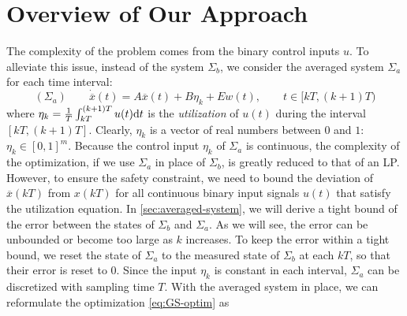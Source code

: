 \section{Overview of Our Approach}


The complexity of the problem comes from the binary control inputs $u$. To
alleviate this issue, instead of the system $\Sigma_b$, we consider the
averaged system $\Sigma_a$ for each time interval:
\[ (\Sigma_a) \hspace{2em} \dot{\overbar{x}} (t) = A \overbar{x} (t) + B
   \eta_k + Ew (t), \hspace{2em} t \in [kT, (k + 1) T) \]
where $\eta_k = \frac{1}{T} \int_{kT}^{(k + 1) T} u (t) \mathrm{d} t$ is the
{\emph{utilization}} of $u (t)$ during the interval $[kT, (k + 1) T]$.
Clearly, $\eta_k$ is a vector of real numbers between $0$ and $1$: $\eta_k \in
[0, 1]^m$. Because the control input $\eta_k$ of $\Sigma_a$ is continuous, the
complexity of the optimization, if we use $\Sigma_a$ in place of $\Sigma_b$,
is greatly reduced to that of an LP. However, to ensure the safety constraint,
we need to bound the deviation of $\overbar{x} (kT)$ from $x (kT)$ for all
continuous binary input signals $u (t)$ that satisfy the utilization equation.
In \cref{sec:averaged-system}, we will derive a tight bound of the
error between the states of $\Sigma_b$ and $\Sigma_a$. As we will see, the
error can be unbounded or become too large as $k$ increases. To keep the error
within a tight bound, we reset the state of $\Sigma_a$ to the measured state
of $\Sigma_b$ at each $kT$, so that their error is reset to $0$. Since the
input $\eta_k$ is constant in each interval, $\Sigma_a$ can be discretized
with sampling time $T$. With the averaged system in place, we can reformulate
the optimization \eqref{eq:GS-optim} as
